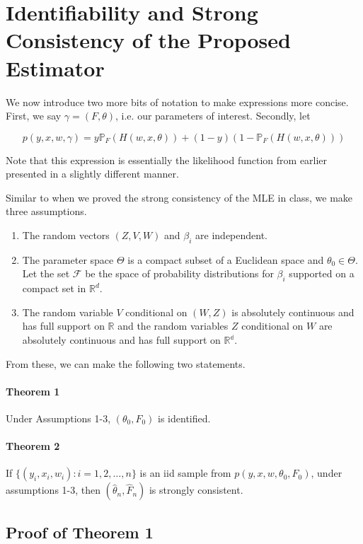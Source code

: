 \documentclass[11pt]{article}
\begin{document}
\section{Identifiability and Strong Consistency of the Proposed Estimator}

\indent

We now introduce two more bits of notation to make expressions more concise. First, we say $\gamma=(F,\theta)$, i.e. our parameters of interest. Secondly, let

\[
p(y,x,w,\gamma)=y\mathbb{P}_F(H(w,x,\theta))+(1-y)(1-\mathbb{P}_F(H(w,x,\theta)))
\]

Note that this expression is essentially the likelihood function from earlier presented in a slightly different manner.

Similar to when we proved the strong consistency of the MLE in class, we make three assumptions.
\begin{enumerate}
    \item The random vectors $(Z,V,W)$ and $\beta_i$ are independent.
    \item The parameter space $\Theta$ is a compact subset of a Euclidean space and $\theta_0\in\Theta$. Let the set $\mathcal F$ be the space of probability distributions for $\beta_i$ supported on a compact set in $\mathbb{R}^d$.
    \item The random variable $V$ conditional on $(W,Z)$ is absolutely continuous and has full support on $\mathbb{R}$ and the random variables $Z$ conditional on $W$ are absolutely continuous and has full support on $\mathbb{R^d}$.
\end{enumerate}

From these, we can make the following two statements.

\paragraph{Theorem 1} Under Assumptions 1-3, $(\theta_0,F_0)$ is identified.

\paragraph{Theorem 2} If $\{(y_i,x_i,w_i):i=1,2,\dots,n\}$ is an iid sample from $p(y,x,w,\theta_0,F_0)$, under assumptions 1-3, then $(\hat \theta_n,\hat F_n)$ is strongly consistent.

\subsection{Proof of Theorem 1}
\end{document}
